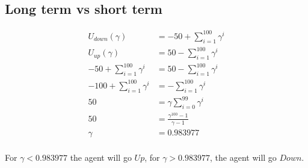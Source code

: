 \documentclass[fleqn,12pt]{scrartcl}
\begin{document}
 \subsection{Long term vs short term}
 \begin{align*}
	 U_{down}(\gamma) &= -50 + \sum_{i=1}^{100} \gamma^i\\
	 U_{up}(\gamma) &= 50 - \sum_{i=1}^{100} \gamma^i\\
-50 + \sum_{i=1}^{100} \gamma^i&= 50 - \sum_{i=1}^{100} \gamma^i\\
-100 + \sum_{i=1}^{100} \gamma^i&= - \sum_{i=1}^{100} \gamma^i\\
	 50 &= \gamma \sum_{i=0}^{99} \gamma^{i}\\
	 50 &= \frac{\gamma^{100}-1}{\gamma -1}\\
	 \gamma &= 0.983977\\
 \end{align*}
 
 For $\gamma < 0.983977$ the agent will go $Up$, for $\gamma > 0.983977$, the agent will go $Down$.
\end{document}
